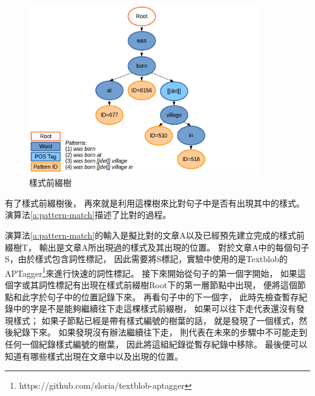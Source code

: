 \begin{figure}
    \centering
    \includegraphics[width=0.9\textwidth]{images/03-pattern-prefix-tree}
    \caption{樣式前綴樹}
    \label{i:pattern-prefix-tree}
\end{figure}

有了樣式前綴樹後，
再來就是利用這棵樹來比對句子中是否有出現其中的樣式。
演算法\ref{a:pattern-match}描述了比對的過程。

演算法\ref{a:pattern-match}的輸入是擬比對的文章A以及已經預先建立完成的樣式前綴樹T，
輸出是文章A所出現過的樣式及其出現的位置。
對於文章A中的每個句子S，由於樣式包含詞性標記，
因此需要將S標記，實驗中使用的是Textblob的APTagger\footnote{https://github.com/sloria/textblob-aptagger}來進行快速的詞性標記。
接下來開始從句子的第一個字開始，
如果這個字或其詞性標記有出現在樣式前綴樹Root下的第一層節點中出現，
便將這個節點和此字於句子中的位置記錄下來。
再看句子中的下一個字，
此時先檢查暫存紀錄中的字是不是能夠繼續往下走這棵樣式前綴樹，
如果可以往下走代表還沒有發現樣式；
如果子節點已經是帶有樣式編號的樹葉的話，
就是發現了一個樣式，然後紀錄下來。
如果發現沒有辦法繼續往下走，
則代表在未來的步驟中不可能走到任何一個紀錄樣式編號的樹葉，
因此將這組紀錄從暫存紀錄中移除。
最後便可以知道有哪些樣式出現在文章中以及出現的位置。


